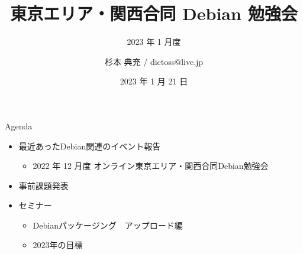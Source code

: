 \title{東京エリア・関西合同 Debian 勉強会}
\subtitle{2023 年 1 月度} %
\author{杉本 典充 / dictoss@live.jp}
\date{2023 年 1 月 21 日}



\begin{frame}
\titlepage{}
\end{frame}

\begin{frame}{Agenda}
 \begin{minipage}[t]{0.45\hsize}
  \begin{itemize}
  \item 最近あったDebian関連のイベント報告
    \begin{itemize}
    \item 2022 年 12 月度 オンライン東京エリア・関西合同Debian勉強会
    \end{itemize}
  \item 事前課題発表
  \end{itemize}
 \end{minipage}
 \begin{minipage}[t]{0.45\hsize}
   \begin{itemize}
   \item セミナー
     \begin{itemize}
     \item Debianパッケージング　アップロード編
     \item 2023年の目標
     \end{itemize}
  \end{itemize}
 \end{minipage}
\end{frame}

